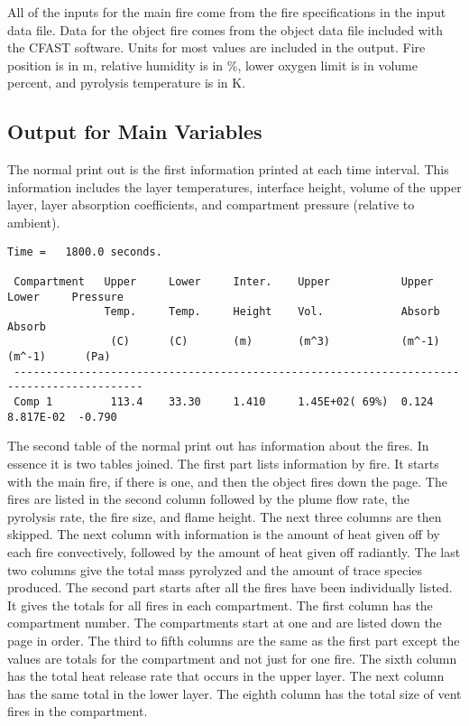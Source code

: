 All of the inputs for the main fire come from the fire specifications in the input data file. Data for the object fire comes from the object data file included with the CFAST software. Units for most values are included in the output.  Fire position is in m, relative humidity is in \%, lower oxygen limit is in volume percent, and pyrolysis temperature is in K.


\subsection{Output for Main Variables}

The normal print out is the first information printed at each time interval.  This information includes the layer temperatures, interface height, volume of the upper layer, layer absorption coefficients, and compartment pressure (relative to ambient).

\begin{lstlisting}[basicstyle=\scriptsize]
 Time =   1800.0 seconds.

 Compartment   Upper     Lower     Inter.    Upper           Upper      Lower     Pressure
               Temp.     Temp.     Height    Vol.            Absorb     Absorb
                (C)      (C)       (m)       (m^3)           (m^-1)     (m^-1)      (Pa)
 ------------------------------------------------------------------------------------------
 Comp 1         113.4    33.30     1.410     1.45E+02( 69%)  0.124      8.817E-02  -0.790
\end{lstlisting}
The second table of the normal print out has information about the fires.  In essence it is two tables joined.  The first part lists information by fire.  It starts with the main fire, if there is one, and then the object fires down the page.  The fires are listed in the second column followed by the plume flow rate, the pyrolysis rate, the fire size, and flame height.  The next three columns are then skipped.  The next column with information is the amount of heat given off by each fire convectively, followed by the amount of heat given off radiantly. The last two columns give the total mass pyrolyzed and the amount of trace species produced.  The second part starts after all the fires have been individually listed.  It gives the totals for all fires in each compartment.  The first column has the compartment number.  The compartments start at one and are listed down the page in order.  The third to fifth columns are the same as the first part except the values are totals for the compartment and not just for one fire.  The sixth column has the total heat release rate that occurs in the upper layer.  The next column has the same total in the lower layer.  The eighth column has the total size of vent fires in the compartment.

